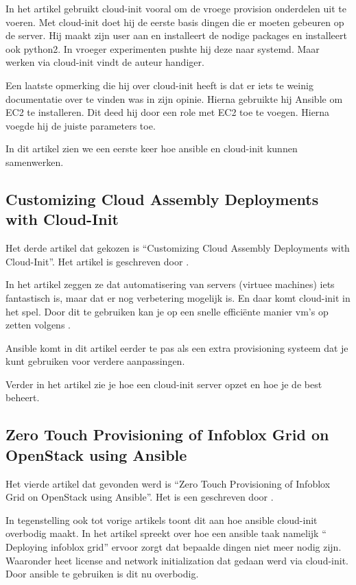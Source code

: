 In het artikel gebruikt \textcite{scottharney} cloud-init vooral om de vroege provision onderdelen uit te voeren. Met cloud-init doet hij de eerste basis dingen die er moeten gebeuren op de server. Hij maakt zijn user aan en installeert de nodige packages en installeert ook python2. In vroeger experimenten pushte hij deze naar systemd. Maar werken via cloud-init vindt de auteur handiger. 

Een laatste opmerking die hij over cloud-init heeft is dat er iets te weinig documentatie over te vinden was in zijn opinie. Hierna gebruikte hij Ansible om EC2 te installeren. Dit deed hij door een role met EC2 toe te voegen. Hierna voegde hij de juiste parameters toe.

In dit artikel zien we een eerste keer hoe ansible en cloud-init kunnen samenwerken.
 
\subsection{Customizing Cloud Assembly Deployments with Cloud-Init}
Het derde artikel dat gekozen is “Customizing Cloud Assembly Deployments with Cloud-Init”. Het artikel is geschreven door \textcite{vmware}.

In het artikel zeggen ze dat automatisering van servers (virtuee machines) iets fantastisch is, maar dat er nog verbetering mogelijk is. En daar komt cloud-init in het spel. Door dit te gebruiken kan je op een snelle efficiënte manier vm’s op zetten volgens \textcite{vmware}. 

Ansible komt in dit artikel eerder te pas als een extra provisioning systeem dat je kunt gebruiken voor verdere aanpassingen. 

Verder in het artikel zie je hoe \textcite{vmware} een cloud-init server opzet en hoe je de best beheert.

\subsection{Zero Touch Provisioning of Infoblox Grid on OpenStack using Ansible}
Het vierde artikel dat gevonden werd is “Zero Touch Provisioning of Infoblox Grid on OpenStack using Ansible”. Het is een geschreven door \textcite{infoblox}.

In tegenstelling ook tot vorige artikels toont dit aan hoe ansible cloud-init overbodig maakt. In het artikel spreekt \textcite{infoblox} over hoe een ansible taak namelijk “ Deploying infoblox grid” ervoor zorgt dat bepaalde dingen niet meer nodig zijn. Waaronder heet license and network initialization dat gedaan werd via cloud-init. Door ansible te gebruiken is dit nu overbodig.
 
